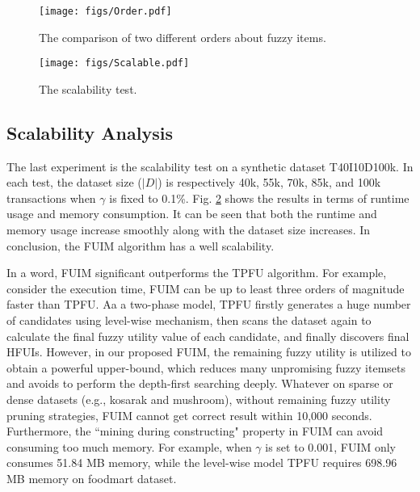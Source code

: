 \documentclass[journal]{IEEEtran}
\begin{document}
\begin{figure}[!hbt]
	\centering
	\texttt{[image: figs/Order.pdf]}
	\caption{The comparison of two different orders about fuzzy items.}
	\label{fig:compare_order}
\end{figure}


\begin{figure}[!htbp]
	\centering
	\texttt{[image: figs/Scalable.pdf]}
	\caption{The scalability test.}
	\label{fig:compare_scalability}
\end{figure}


\subsection{Scalability Analysis}

The last experiment is the scalability test on a synthetic dataset T40I10D100k. In each test, the dataset size ($|D|$) is respectively 40k, 55k, 70k, 85k, and 100k transactions when $\gamma$ is fixed to 0.1\%. Fig. \ref{fig:compare_scalability} shows the results in terms of runtime usage and memory consumption. It can be seen that both the runtime and memory usage increase smoothly along with the dataset size increases. In conclusion, the FUIM algorithm has a well scalability.

In a word, FUIM significant outperforms the TPFU algorithm. For example, consider the execution time, FUIM can be up to least three orders of magnitude faster than TPFU. Aa a two-phase model, TPFU firstly generates a huge number of candidates using level-wise mechanism, then scans the dataset again to calculate the final fuzzy utility value of each candidate, and finally discovers final HFUIs. However, in our proposed FUIM, the remaining fuzzy utility is utilized to obtain a powerful upper-bound, which reduces many unpromising fuzzy itemsets and avoids to perform the depth-first searching deeply. Whatever on sparse or dense datasets (e.g., kosarak and mushroom), without remaining fuzzy utility pruning strategies, FUIM cannot get correct result within 10,000 seconds. Furthermore, the ``mining during constructing" property in FUIM can avoid consuming too much memory. For example, when $\gamma$ is set to 0.001, FUIM only consumes 51.84 MB memory, while the level-wise model TPFU requires 698.96 MB memory on foodmart dataset.
\end{document}
